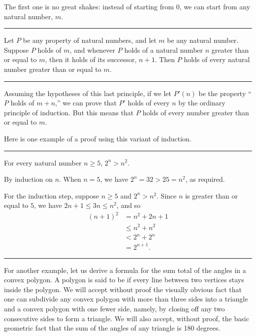 \documentclass[letterpaper,10pt,english]{sphinxmanual}
\begin{document}
\sphinxAtStartPar
The first one is no great shakes: instead of starting from \(0\), we can start from any natural number, \(m\).


\bigskip\hrule\bigskip


\sphinxAtStartPar
{} Let \(P\) be any property of natural numbers, and let \(m\) be any natural number. Suppose \(P\) holds of \(m\), and whenever \(P\) holds of a natural number \(n\) greater than or equal to \(m\), then it holds of its successor, \(n + 1\). Then \(P\) holds of every natural number greater than or equal to \(m\).


\bigskip\hrule\bigskip


\sphinxAtStartPar
Assuming the hypotheses of this last principle, if we let \(P'(n)\) be the property “\(P\) holds of \(m + n\),” we can prove that \(P'\) holds of every \(n\) by the ordinary principle of induction. But this means that \(P\) holds of every number greater than or equal to \(m\).

\sphinxAtStartPar
Here is one example of a proof using this variant of induction.


\bigskip\hrule\bigskip


\sphinxAtStartPar
{} For every natural number \(n \geq 5\), \(2^n > n^2\).

\sphinxAtStartPar
{} By induction on \(n\). When \(n = 5\), we have \(2^n = 32 > 25 = n^2\), as required.

\sphinxAtStartPar
For the induction step, suppose \(n \ge 5\) and \(2^n > n^2\). Since \(n\) is greater than or equal to \(5\), we have \(2n + 1 \leq 3 n \leq n^2\), and so
\begin{equation*}
\begin{split}(n+1)^2 &= n^2 + 2n + 1 \\
 & \leq n^2 + n^2 \\
 & < 2^n + 2^n \\
 & = 2^{n+1}.\end{split}
\end{equation*}

\bigskip\hrule\bigskip


\sphinxAtStartPar
For another example, let us derive a formula for the sum total of the angles in a convex polygon. A polygon is said to be  if every line between two vertices stays inside the polygon. We will accept without proof the visually obvious fact that one can subdivide any convex polygon with more than three sides into a triangle and a convex polygon with one fewer side, namely, by closing off any two consecutive sides to form a triangle. We will also accept, without proof, the basic geometric fact that the sum of the angles of any triangle is 180 degrees.
\end{document}
